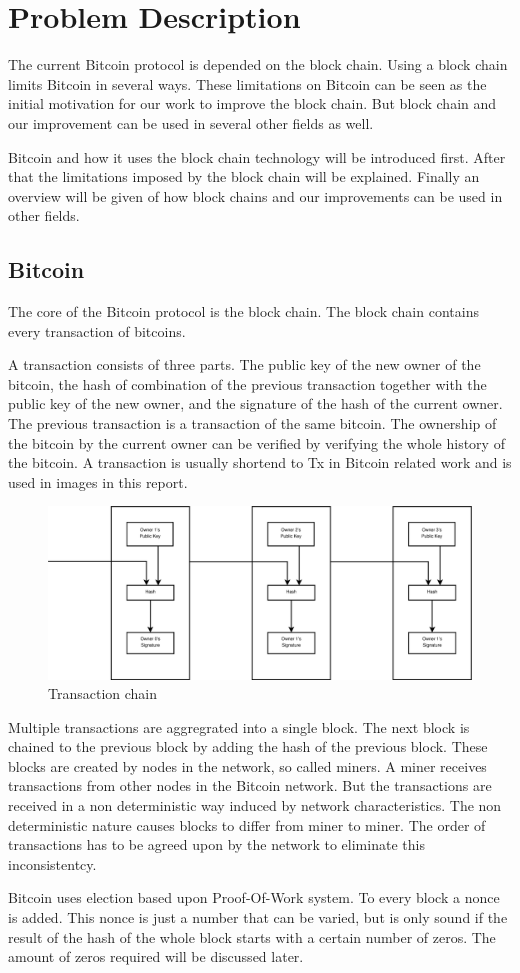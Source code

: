 \chapter{Problem Description}

The current Bitcoin protocol is depended on the block chain. 
Using a block chain limits Bitcoin in several ways.
These limitations on Bitcoin can be seen as the initial motivation 
for our work to improve the block chain.
But block chain and our improvement can be used in several other fields as well.

Bitcoin and how it uses the block chain technology will be introduced first.
After that the limitations imposed by the block chain will be explained.
Finally an overview will be given of how block chains and our improvements can be used in other fields.

\section{Bitcoin}
The core of the Bitcoin protocol is the block chain.
The block chain contains every transaction of bitcoins.

A transaction consists of three parts.
The public key of the new owner of the bitcoin,
the hash of combination of the previous transaction together with the public key of the new owner,
and the signature of the hash of the current owner.
The previous transaction is a transaction of the same bitcoin.
The ownership of the bitcoin by the current owner can be verified
by verifying the whole history of the bitcoin.
A transaction is usually shortend to Tx in Bitcoin related work and is used in images in this report.

\begin{figure}[H]
	\centerline{\includegraphics[scale=0.3]{problemDescription/figs/transactions.eps}}
	\caption{Transaction chain}
\end{figure}

Multiple transactions are aggregrated into a single block.
The next block is chained to the previous block by adding the hash of the previous block.
These blocks are created by nodes in the network, so called miners.
A miner receives transactions from other nodes in the Bitcoin network.
But the transactions are received in a non deterministic way induced by network characteristics.
The non deterministic nature causes blocks to differ from miner to miner.
The order of transactions has to be agreed upon by the network to eliminate this inconsistentcy.

Bitcoin uses election based upon Proof-Of-Work system.
To every block a nonce is added. 
This nonce is just a number that can be varied,
but is only sound if the result of the hash of the whole block starts with a certain number of zeros.
The amount of zeros required will be discussed later.
